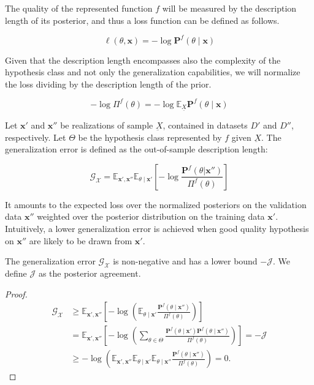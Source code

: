 The quality of the represented function $f$ will be measured by the description
length of its posterior, and thus a loss function can be defined as follows.

$$
    \ell (\theta, \bm{x}) = - \log \mathbf{P}^f (\theta \mid \bm {x})
$$



Given that the description length encompasses also the complexity of the hypothesis
class and not only the generalization capabilities, we will normalize the loss dividing by the
description length of the prior.

$$
    - \log \Pi^f (\theta) = - \log \mathbb{E}_{\underline{X}} \mathbf{P}^f (\theta \mid \bm{x})
$$

\begin{definition}
    Let $\bm{x'}$ and $\bm{x''}$ be realizations of sample $\underbar{X}$, 
    contained in datasets $D'$ and $D''$, respectively.
    Let $\Theta$ be the hypothesis class represented by $f$ given $\underbar{X}$. The generalization error 
     is defined as the out-of-sample description length:

    $$
        \mathcal{G}_{\mathcal{X}} = \mathbb{E}_{\bm{x}', \bm{x}''} \mathbb{E}_{\theta \mid \bm{x}'} \left[ - \log \frac{\mathbf{P}^f(\theta | \bm{x}'')}{\Pi^f (\theta)} \right]
    $$
    
\end{definition}

It amounts to the expected loss over the normalized posteriors on the validation data
$\bm{x}''$ weighted over the posterior distribution on the training data $\bm{x}'$.
Intuitively, a lower generalization error is achieved when good quality hypothesis
on $\bm{x}''$ are likely to be drawn from $\bm{x}'$. 

\begin{lemma}\label{lemma:pa}
    The generalization error $\mathcal{G}_{\mathcal{X}}$ is non-negative and has a lower bound $-\mathcal{J}$. We define $\mathcal{J}$ as the posterior agreement.
\end{lemma}
\begin{proof}
    $$
    \begin{aligned}
        \mathcal{G}_{\mathcal{X}} & \geq \mathbb{E}_{\bm{x}', \bm{x}''}\left[-\log \left(\mathbb{E}_{\theta \mid \bm{x}'} \frac{\mathbf{P}^{f}\left(\theta \mid \bm{x}''\right)}{\Pi^{f}(\theta)}\right)\right] \\
        & =\mathbb{E}_{\bm{x}', \bm{x}''} \left[-\log \left(\sum_{\theta \in \Theta} \frac{\mathbf{P}^{f}\left(\theta \mid \bm{x}'\right) \mathbf{P}^{f}\left(\theta \mid \bm{x}'' \right)}{\Pi^{f}(\theta)}\right)\right] = -\mathcal{J} \\
        & \geq-\log \left(\mathbb{E}_{\bm{x}', \bm{x}''} \mathbb{E}_{\theta \mid \bm{x}'} \mathbb{E}_{\theta \mid \bm{x}''} \frac{\mathbf{P}^{f}\left(\theta \mid \bm{x}''\right)}{\Pi^{f}(\theta)}\right)=0 .
    \end{aligned}
    $$
\end{proof}

